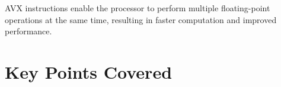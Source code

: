 

AVX instructions enable the processor to perform multiple floating-point operations at the same time, resulting in faster computation and improved performance. \cite{Schuchart2016TheScale}



\section{Key Points Covered}
